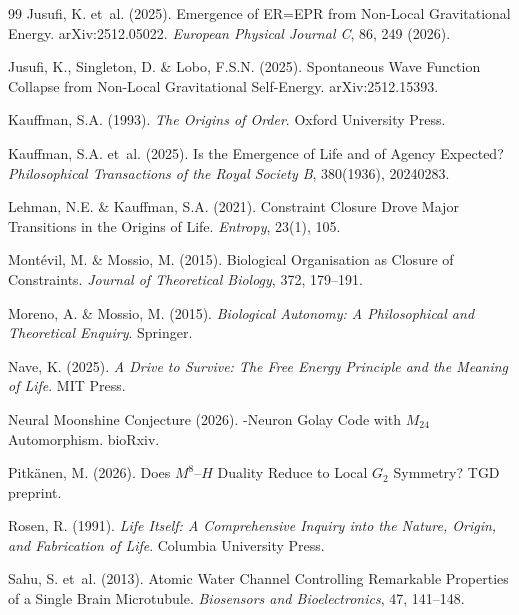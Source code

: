 \documentclass[12pt,a4paper]{article}
\begin{document}
\begin{thebibliography}{99}
Jusufi, K. et~al. (2025).
\newblock Emergence of ER=EPR from Non-Local Gravitational Energy.
\newblock arXiv:2512.05022. \textit{European Physical Journal C}, 86, 249 (2026).

Jusufi, K., Singleton, D. \& Lobo, F.S.N. (2025).
\newblock Spontaneous Wave Function Collapse from Non-Local Gravitational Self-Energy.
\newblock arXiv:2512.15393.

Kauffman, S.A. (1993).
\newblock \textit{The Origins of Order}.
\newblock Oxford University Press.

Kauffman, S.A. et~al. (2025).
\newblock Is the Emergence of Life and of Agency Expected?
\newblock \textit{Philosophical Transactions of the Royal Society B}, 380(1936), 20240283.

Lehman, N.E. \& Kauffman, S.A. (2021).
\newblock Constraint Closure Drove Major Transitions in the Origins of Life.
\newblock \textit{Entropy}, 23(1), 105.

Mont\'evil, M. \& Mossio, M. (2015).
\newblock Biological Organisation as Closure of Constraints.
\newblock \textit{Journal of Theoretical Biology}, 372, 179--191.

Moreno, A. \& Mossio, M. (2015).
\newblock \textit{Biological Autonomy: A Philosophical and Theoretical Enquiry}.
\newblock Springer.

Nave, K. (2025).
\newblock \textit{A Drive to Survive: The Free Energy Principle and the Meaning of Life}.
\newblock MIT Press.

Neural Moonshine Conjecture (2026).
-Neuron Golay Code with $M_{24}$ Automorphism.
\newblock bioRxiv.

Pitk\"anen, M. (2026).
\newblock Does $M^8$--$H$ Duality Reduce to Local $G_2$ Symmetry?
\newblock TGD preprint.

Rosen, R. (1991).
\newblock \textit{Life Itself: A Comprehensive Inquiry into the Nature, Origin, and Fabrication of Life}.
\newblock Columbia University Press.

Sahu, S. et~al. (2013).
\newblock Atomic Water Channel Controlling Remarkable Properties of a Single Brain Microtubule.
\newblock \textit{Biosensors and Bioelectronics}, 47, 141--148.


\end{thebibliography}
\end{document}
